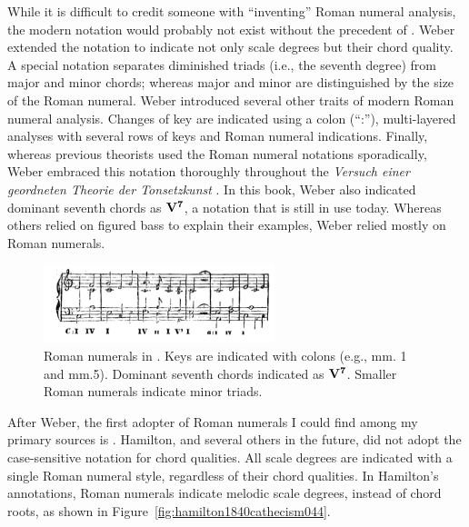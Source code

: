 While it is difficult to credit someone with ``inventing'' Roman numeral analysis, the modern notation would probably not exist without the precedent of \textcite{weber1817versuch}.
Weber extended the notation to indicate not only scale degrees but their chord quality.
A special notation separates diminished triads (i.e., the seventh degree) from major and minor chords; whereas major and minor are distinguished by the size of the Roman numeral.
Weber introduced several other traits of modern Roman numeral analysis.
Changes of key are indicated using a colon (``:''), multi-layered analyses with several rows of keys and Roman numeral indications.
Finally, whereas previous theorists used the Roman numeral notations sporadically, Weber embraced this notation thoroughly throughout the \emph{Versuch einer geordneten Theorie der Tonsetzkunst} \parencite{weber1817versuch}.
In this book, Weber also indicated dominant seventh chords as $\textbf{V}\relax\relax{\footnotesize {}^\textbf{7}\relax\relax}$, a notation that is still in use today.
Whereas others relied on figured bass to explain their examples, Weber relied mostly on Roman numerals.

\begin{figure}[h!]
    \centering
    \includegraphics[width=0.6\textwidth]{figures/chapter/2/primary_sources/weber1817versuch205.png}
    \caption{Roman numerals in \textcite{weber1817versuch}. Keys are indicated with colons (e.g., mm. 1 and mm.5). Dominant seventh chords indicated as $\textbf{V}\relax\relax{\footnotesize {}^\textbf{7}\relax\relax}$. Smaller Roman numerals indicate minor triads.}
    \label{fig:weber1817versuch205}
\end{figure}

After Weber, the first adopter of Roman numerals I could find among my primary sources is \textcite{hamilton1840catechism}.
Hamilton, and several others in the future, did not adopt the case-sensitive notation for chord qualities.
All scale degrees are indicated with a single Roman numeral style, regardless of their chord qualities.
In Hamilton's annotations, Roman numerals indicate melodic scale degrees, instead of chord roots, as shown in Figure~\ref{fig:hamilton1840cathecism044}.

